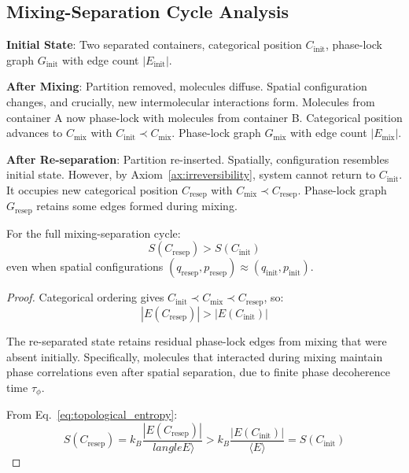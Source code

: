 \subsection{Mixing-Separation Cycle Analysis}

\textbf{Initial State}: Two separated containers, categorical position $C_{\text{init}}$, phase-lock graph $G_{\text{init}}$ with edge count $|E_{\text{init}}|$.

\textbf{After Mixing}: Partition removed, molecules diffuse. Spatial configuration changes, and crucially, new intermolecular interactions form. Molecules from container A now phase-lock with molecules from container B. Categorical position advances to $C_{\text{mix}}$ with $C_{\text{init}} \prec C_{\text{mix}}$. Phase-lock graph $G_{\text{mix}}$ with edge count $|E_{\text{mix}}|$.

\textbf{After Re-separation}: Partition re-inserted. Spatially, configuration resembles initial state. However, by Axiom~\ref{ax:irreversibility}, system cannot return to $C_{\text{init}}$. It occupies new categorical position $C_{\text{resep}}$ with $C_{\text{mix}} \prec C_{\text{resep}}$. Phase-lock graph $G_{\text{resep}}$ retains some edges formed during mixing.

\begin{theorem}
\label{thm:entropy_cycle}
For the full mixing-separation cycle:
\begin{equation}
S(C_{\text{resep}}) > S(C_{\text{init}})
\end{equation}
even when spatial configurations $(q_{\text{resep}}, p_{\text{resep}}) \approx (q_{\text{init}}, p_{\text{init}})$.
\end{theorem}

\begin{proof}
Categorical ordering gives $C_{\text{init}} \prec C_{\text{mix}} \prec C_{\text{resep}}$, so:
\begin{equation}
|E(C_{\text{resep}})| > |E(C_{\text{init}})|
\end{equation}

The re-separated state retains residual phase-lock edges from mixing that were absent initially. Specifically, molecules that interacted during mixing maintain phase correlations even after spatial separation, due to finite phase decoherence time $\tau_{\phi}$.

From Eq.~\eqref{eq:topological_entropy}:
\begin{equation}
S(C_{\text{resep}}) = k_B \frac{|E(C_{\text{resep}})|}{\ langle E \rangle} > k_B \frac{|E(C_{\text{init}})|}{\langle E \rangle} = S(C_{\text{init}})
\end{equation}
\end{proof}

